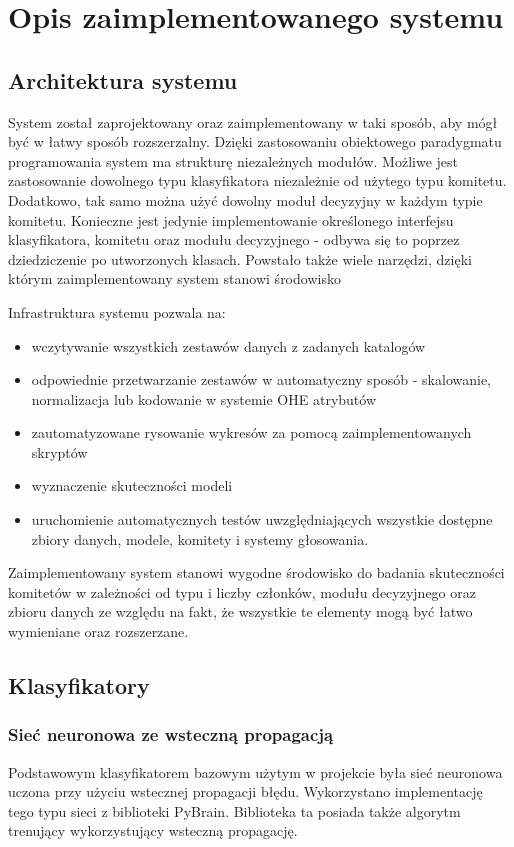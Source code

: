 \documentclass[11pt, a4paper, titlepage]{report}
\begin{document}
\chapter{Opis zaimplementowanego systemu}
\section{Architektura systemu}
System został zaprojektowany oraz zaimplementowany w taki sposób, aby mógł być w łatwy sposób rozszerzalny. Dzięki zastosowaniu obiektowego paradygmatu programowania system ma strukturę niezależnych modułów. Możliwe jest zastosowanie dowolnego typu klasyfikatora niezależnie od użytego typu komitetu. Dodatkowo, tak samo można użyć dowolny moduł decyzyjny w każdym typie komitetu. Konieczne jest jedynie implementowanie określonego interfejsu klasyfikatora, komitetu oraz modułu decyzyjnego - odbywa się to poprzez dziedziczenie po utworzonych klasach. Powstało także wiele narzędzi, dzięki którym zaimplementowany system stanowi środowisko 

Infrastruktura systemu pozwala na:
\begin{itemize}
\item wczytywanie wszystkich zestawów danych z zadanych katalogów
\item odpowiednie przetwarzanie zestawów w automatyczny sposób - skalowanie, normalizacja lub kodowanie w systemie OHE atrybutów
\item zautomatyzowane rysowanie wykresów za pomocą zaimplementowanych skryptów
\item wyznaczenie skuteczności modeli
\item uruchomienie automatycznych testów uwzględniających wszystkie dostępne zbiory danych, modele, komitety i systemy głosowania.
\end{itemize}

Zaimplementowany system stanowi wygodne środowisko do badania skuteczności komitetów w zależności od typu i liczby członków, modułu decyzyjnego oraz zbioru danych ze względu na fakt, że wszystkie te elementy mogą być łatwo wymieniane oraz rozszerzane.

\section{Klasyfikatory}
\subsection{Sieć neuronowa ze wsteczną propagacją}
Podstawowym klasyfikatorem bazowym użytym w projekcie była sieć neuronowa uczona przy użyciu wstecznej propagacji błędu. Wykorzystano implementację tego typu sieci z biblioteki PyBrain. Biblioteka ta posiada także algorytm trenujący wykorzystujący wsteczną propagację.
\end{document}
